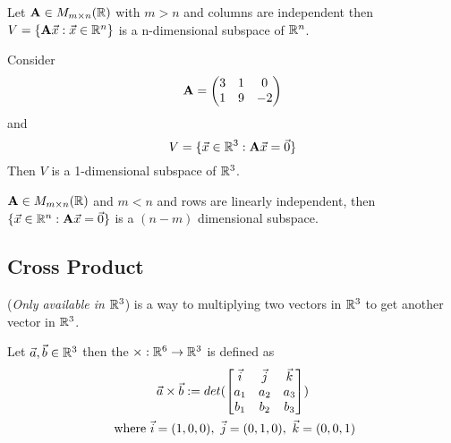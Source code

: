 \documentclass[]{article}
\begin{document}
        \begin{theorem}
            Let $\textbf{A} \in M_{{m} \times {n}}(\mathbb{R})$ with $m > n$ and columns are independent then $V = \{\textbf{A}\vec{x}: \vec{x} \in \mathbb{R}^n\}$ is a n-dimensional subspace of $\mathbb{R}^n$.
        \end{theorem}
        
        \begin{example} 
            Consider 
            \[
                \textbf{A} = \begin{pmatrix}
                    3 & 1 & 0 \\ 1 & 9 & -2
                \end{pmatrix}
            \] and 
            \[
                V = \{\vec{x} \in \mathbb{R}^3: \textbf{A} \vec{x} = \vec{0}\}
            \]
            Then $V$ is a 1-dimensional subspace of $\mathbb{R}^3$.
        \end{example}
        
        \begin{theorem}
            $\textbf{A} \in M_{{m} \times {n}}(\mathbb{R})$ and $m < n$ and rows are linearly independent, then $\{ \vec{x} \in \mathbb{R}^n: \textbf{A}\vec{x} = \vec{0} \}$ is a $(n-m)$ dimensional subspace.
        \end{theorem}
        
        \subsection{Cross Product}
            (\emph{Only available in $\mathbb{R}^3$}) is a way to multiplying two vectors in $\mathbb{R}^3$ to get another vector in $\mathbb{R}^3$.
            \begin{definition}
                Let $\vec{a}, \vec{b} \in \mathbb{R}^3$ then the  ${\times}: {\mathbb{R}^6} \to {\mathbb{R}^3}$ is defined as
                \begin{gather*}
                    \vec{a} \times \vec{b} := det(
                        \begin{bmatrix}
                            \vec{i} & \vec{j} & \vec{k} \\
                            a_1 & a_2 & a_3 \\
                            b_1 & b_2 & b_3 \\
                        \end{bmatrix}
                    ) \\
                    \tx{ where } \vec{i} = (1,0,0),\ \vec{j} = (0,1,0),\ \vec{k} = (0,0,1)
                \end{gather*}
            \end{definition}
            
\end{document}
